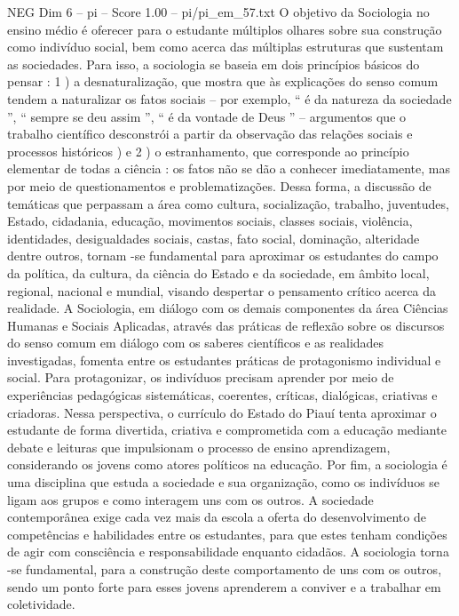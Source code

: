 \begin{textsample}{NEG Dim 6 – pi – Score 1.00 – pi/pi\_em\_57.txt}
O objetivo da Sociologia no ensino médio é oferecer para o estudante múltiplos olhares sobre sua construção como indivíduo social, bem como acerca das múltiplas estruturas que sustentam as sociedades.
Para isso, a sociologia se baseia em dois princípios básicos do pensar : 1 ) a desnaturalização, que mostra que às explicações do senso comum tendem a naturalizar os fatos sociais – por exemplo, “ é da natureza da sociedade ”, “ sempre se deu assim ”, “ é da vontade de Deus ” – argumentos que o trabalho científico desconstrói a partir da observação das relações sociais e processos históricos ) e 2 ) o estranhamento, que corresponde ao princípio elementar de todas a ciência : os fatos não se dão a conhecer imediatamente, mas por meio de questionamentos e problematizações.
Dessa forma, a discussão de temáticas que perpassam a área como cultura, socialização, trabalho, juventudes, Estado, cidadania, educação, movimentos sociais, classes sociais, violência, identidades, desigualdades sociais, castas, fato social, dominação, alteridade dentre outros, tornam -se fundamental para aproximar os estudantes do campo da política, da cultura, da ciência do Estado e da sociedade, em âmbito local, regional, nacional e mundial, visando despertar o pensamento crítico acerca da realidade.
A Sociologia, em diálogo com os demais componentes da área Ciências Humanas e Sociais Aplicadas, através das práticas de reflexão sobre os discursos do senso comum em diálogo com os saberes científicos e as realidades investigadas, fomenta entre os estudantes práticas de protagonismo individual e social.
Para protagonizar, os indivíduos precisam aprender por meio de experiências pedagógicas sistemáticas, coerentes, críticas, dialógicas, criativas e criadoras.
Nessa perspectiva, o currículo do Estado do Piauí tenta aproximar o estudante de forma divertida, criativa e comprometida com a educação mediante debate e leituras que impulsionam o processo de ensino aprendizagem, considerando os jovens como atores políticos na educação.
Por fim, a sociologia é uma disciplina que estuda a sociedade e sua organização, como os indivíduos se ligam aos grupos e como interagem uns com os outros.
A sociedade contemporânea exige cada vez mais da escola a oferta do desenvolvimento de competências e habilidades entre os estudantes, para que estes tenham condições de agir com consciência e responsabilidade enquanto cidadãos.
A sociologia torna -se fundamental, para a construção deste comportamento de uns com os outros, sendo um ponto forte para esses jovens aprenderem a conviver e a trabalhar em coletividade.

\end{textsample}
